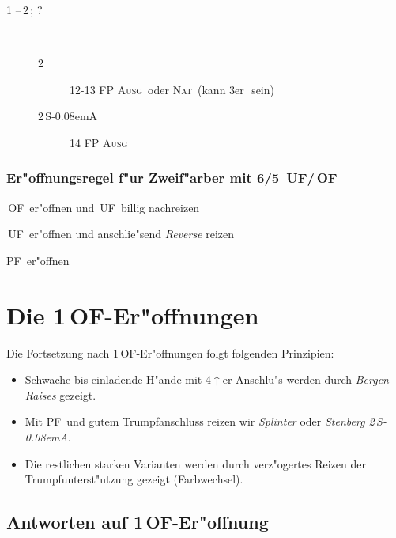 \documentclass[11pt,german,twocolumn]{scrartcl}
\renewcommand{\Cl}{{\color{ClColor}{\clubs}}}
\renewcommand{\Di}{{\color{DiColor}{\sdiamonds}}}
\def\kar{\,\Di}
\def\tre{\,\Cl}
\def\bad{$^-$}
\def\pl{$\uparrow$}
\def\uf{\textsf{\,UF}}
\def\of{\textsf{\,OF}}
\def\sa{\textsf{S\kern-0.08emA}}
\def\SA{\,\sa}
\def\sep{\,--\,}
\newcommand{\conv}[1]{\emph{#1}}
\def\bal{\textsc{Ausg}}
\def\nat{\textsc{Nat}}
\def\pf{\textsc{PF}}
\def\bdsc{\begin{description}}
\def\edsc{\end{description}}
\begin{document}
\bdsc
  \item[1\kar\sep2\tre; ?]~
    \bdsc
    \item[2\kar] 12-13 FP \bal\ oder \nat\ (kann 3er\kar\ sein)
    \item[2\SA] 14 FP \bal
    \edsc
\edsc


\subsubsection*{\label{zfregel}Er"offnungsregel f"ur Zweif"arber mit 6/5 \uf/\of}

\bdsc
\setlength{\labelsep}{1ex}
\item[4\pl{} Verlierer:] \of\ er"offnen und \uf\ billig nachreizen
\item[3-4 Verlierer:] \uf\ er"offnen und anschlie"send \conv{Reverse}
  reizen
\item[0-3\bad\ Verlierer:] \pf\ er"offnen
\edsc

\section{Die 1\of-Er"offnungen}

Die Fortsetzung nach 1\of-Er"offnungen folgt folgenden Prinzipien:
\begin{itemize}
\setlength{\itemsep}{0.5ex}
\item Schwache bis einladende H"ande mit 4\pl{}er-Anschlu"s werden durch
  \conv{Bergen Raises} gezeigt.
\item Mit \pf\ und gutem Trumpfanschluss reizen wir
  \conv{Splinter} oder \conv{Stenberg 2\SA}.
\item Die restlichen starken Varianten werden durch verz"ogertes
  Reizen der Trumpfunterst"utzung gezeigt (Farbwechsel).
\end{itemize}

\subsection{Antworten auf 1\of-Er"offnung}
\end{document}
